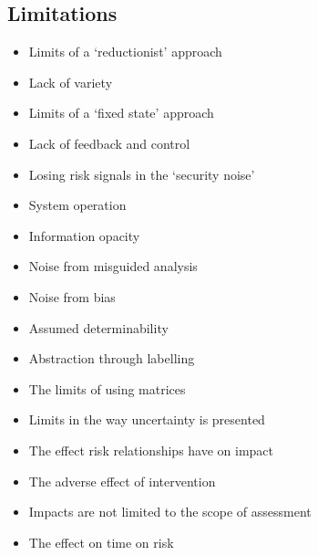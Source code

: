 \subsection*{Limitations}
\begin{itemize}
    \item Limits of a `reductionist' approach
    \item Lack of variety
    \item Limits of a `fixed state' approach
    \item Lack of feedback and control
    \item Losing risk signals in the `security noise'
    \item System operation
    \item Information opacity
    \item Noise from misguided analysis
    \item Noise from bias
    \item Assumed determinability
    \item Abstraction through labelling
    \item The limits of using matrices
    \item Limits in the way uncertainty is presented
    \item The effect risk relationships have on impact
    \item The adverse effect of intervention
    \item Impacts are not limited to the scope of assessment
    \item The effect on time on risk
\end{itemize}